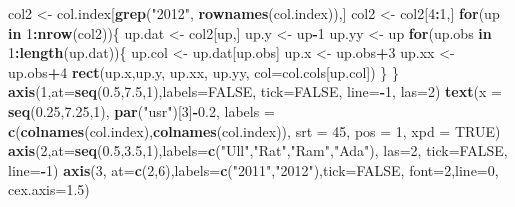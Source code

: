 \documentclass[]{article}
\newenvironment{Shaded}{\begin{snugshade}}{\end{snugshade}}
\newcommand{\KeywordTok}[1]{\textcolor[rgb]{0.13,0.29,0.53}{\textbf{#1}}}
\newcommand{\DataTypeTok}[1]{\textcolor[rgb]{0.13,0.29,0.53}{#1}}
\newcommand{\DecValTok}[1]{\textcolor[rgb]{0.00,0.00,0.81}{#1}}
\newcommand{\FloatTok}[1]{\textcolor[rgb]{0.00,0.00,0.81}{#1}}
\newcommand{\StringTok}[1]{\textcolor[rgb]{0.31,0.60,0.02}{#1}}
\newcommand{\OtherTok}[1]{\textcolor[rgb]{0.56,0.35,0.01}{#1}}
\newcommand{\ControlFlowTok}[1]{\textcolor[rgb]{0.13,0.29,0.53}{\textbf{#1}}}
\newcommand{\OperatorTok}[1]{\textcolor[rgb]{0.81,0.36,0.00}{\textbf{#1}}}
\newcommand{\NormalTok}[1]{#1}
\begin{document}
\begin{Shaded}
\begin{Highlighting}[]
\NormalTok{col2 <-}\StringTok{ }\NormalTok{col.index[}\KeywordTok{grep}\NormalTok{(}\StringTok{"2012"}\NormalTok{, }\KeywordTok{rownames}\NormalTok{(col.index)),]}
\NormalTok{col2 <-}\StringTok{ }\NormalTok{col2[}\DecValTok{4}\OperatorTok{:}\DecValTok{1}\NormalTok{,]}
\ControlFlowTok{for}\NormalTok{(up }\ControlFlowTok{in} \DecValTok{1}\OperatorTok{:}\KeywordTok{nrow}\NormalTok{(col2))\{}
\NormalTok{  up.dat <-}\StringTok{ }\NormalTok{col2[up,]}
\NormalTok{  up.y <-}\StringTok{ }\NormalTok{up}\OperatorTok{-}\DecValTok{1}
\NormalTok{  up.yy <-}\StringTok{ }\NormalTok{up}
  \ControlFlowTok{for}\NormalTok{(up.obs }\ControlFlowTok{in} \DecValTok{1}\OperatorTok{:}\KeywordTok{length}\NormalTok{(up.dat))\{}
\NormalTok{    up.col <-}\StringTok{ }\NormalTok{up.dat[up.obs]}
\NormalTok{    up.x <-}\StringTok{ }\NormalTok{up.obs}\OperatorTok{+}\DecValTok{3}
\NormalTok{    up.xx <-}\StringTok{  }\NormalTok{up.obs}\OperatorTok{+}\DecValTok{4}
    \KeywordTok{rect}\NormalTok{(up.x,up.y, up.xx, up.yy, }\DataTypeTok{col=}\NormalTok{col.cols[up.col])}
\NormalTok{  \}}
\NormalTok{\}}
\KeywordTok{axis}\NormalTok{(}\DecValTok{1}\NormalTok{,}\DataTypeTok{at=}\KeywordTok{seq}\NormalTok{(}\FloatTok{0.5}\NormalTok{,}\FloatTok{7.5}\NormalTok{,}\DecValTok{1}\NormalTok{),}\DataTypeTok{labels=}\OtherTok{FALSE}\NormalTok{, }\DataTypeTok{tick=}\OtherTok{FALSE}\NormalTok{, }\DataTypeTok{line=}\OperatorTok{-}\DecValTok{1}\NormalTok{, }\DataTypeTok{las=}\DecValTok{2}\NormalTok{)}
\KeywordTok{text}\NormalTok{(}\DataTypeTok{x =} \KeywordTok{seq}\NormalTok{(}\FloatTok{0.25}\NormalTok{,}\FloatTok{7.25}\NormalTok{,}\DecValTok{1}\NormalTok{), }\KeywordTok{par}\NormalTok{(}\StringTok{"usr"}\NormalTok{)[}\DecValTok{3}\NormalTok{]}\OperatorTok{-}\FloatTok{0.2}\NormalTok{, }\DataTypeTok{labels =} \KeywordTok{c}\NormalTok{(}\KeywordTok{colnames}\NormalTok{(col.index),}\KeywordTok{colnames}\NormalTok{(col.index)), }\DataTypeTok{srt =} \DecValTok{45}\NormalTok{, }\DataTypeTok{pos =} \DecValTok{1}\NormalTok{, }\DataTypeTok{xpd =} \OtherTok{TRUE}\NormalTok{)}
\KeywordTok{axis}\NormalTok{(}\DecValTok{2}\NormalTok{,}\DataTypeTok{at=}\KeywordTok{seq}\NormalTok{(}\FloatTok{0.5}\NormalTok{,}\FloatTok{3.5}\NormalTok{,}\DecValTok{1}\NormalTok{),}\DataTypeTok{labels=}\KeywordTok{c}\NormalTok{(}\StringTok{"Ull"}\NormalTok{,}\StringTok{"Rat"}\NormalTok{,}\StringTok{"Ram"}\NormalTok{,}\StringTok{"Ada"}\NormalTok{), }\DataTypeTok{las=}\DecValTok{2}\NormalTok{, }\DataTypeTok{tick=}\OtherTok{FALSE}\NormalTok{, }\DataTypeTok{line=}\OperatorTok{-}\DecValTok{1}\NormalTok{)}
\KeywordTok{axis}\NormalTok{(}\DecValTok{3}\NormalTok{, }\DataTypeTok{at=}\KeywordTok{c}\NormalTok{(}\DecValTok{2}\NormalTok{,}\DecValTok{6}\NormalTok{),}\DataTypeTok{labels=}\KeywordTok{c}\NormalTok{(}\StringTok{"2011"}\NormalTok{,}\StringTok{"2012"}\NormalTok{),}\DataTypeTok{tick=}\OtherTok{FALSE}\NormalTok{, }\DataTypeTok{font=}\DecValTok{2}\NormalTok{,}\DataTypeTok{line=}\DecValTok{0}\NormalTok{, }\DataTypeTok{cex.axis=}\FloatTok{1.5}\NormalTok{)}

\end{Highlighting}
\end{Shaded}
\end{document}
